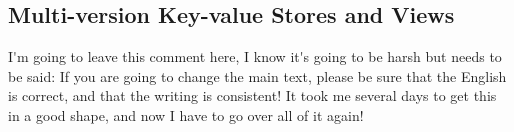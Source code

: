 \subsection{Multi-version Key-value Stores and Views}
\label{sec:mkvs-view}
\ac{I'm going to leave this comment here, I know it's going to be harsh but needs to be said: 
If you are going to change the main text, please be sure that the English is correct, and that the 
writing is consistent! It took me several days to get this in a good shape, and now I have to go over all of it again!}









